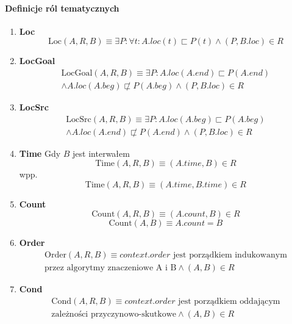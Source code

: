\documentclass[a4paper, 12pt]{article}
\theoremstyle{remark}
\begin{document}
\paragraph{Definicje ról tematycznych} %
\label{par:role_tematyczne}
\begin{enumerate}
\item \textbf{Loc}
\begin{equation}
\text{Loc}(A,R,B) \equiv \exists P: \forall t: A.loc(t) \sqsubset P(t) \wedge (P,B.loc) \in R
\end{equation}
\item \textbf{LocGoal}
\begin{align}
\nonumber\text{LocGoal}(A,R,B) \equiv \exists P: A.loc(A.end) \sqsubset P(A.end) \\ \wedge A.loc(A.beg) \not\sqsubset P(A.beg) \wedge (P,B.loc) \in R
\end{align}
\item \textbf{LocSrc}
\begin{align}
\nonumber\text{LocSrc}(A,R,B) \equiv \exists P: A.loc(A.beg) \sqsubset P(A.beg) \\ \wedge A.loc(A.end) \not\sqsubset P(A.end) \wedge (P,B.loc) \in R
\end{align}
\item \textbf{Time}
Gdy $B$ jest interwałem
\begin{equation}
\text{Time}(A,R,B) \equiv (A.time,B) \in R
\end{equation}
wpp.
\begin{equation}
\text{Time}(A,R,B) \equiv (A.time,B.time) \in R
\end{equation}
\item \textbf{Count}
\begin{equation}
\text{Count}(A,R,B) \equiv (A.count,B) \in R
\end{equation}
\begin{equation}
\text{Count}(A,B) \equiv A.count = B
\end{equation}
\item \textbf{Order}
\begin{align}
\nonumber\text{Order}(A,R,B) \equiv
context.order \text{ jest porządkiem indukowanym} \\ \text{przez algorytmy znaczeniowe A i B} \wedge (A,B) \in R
\end{align}
\item \textbf{Cond}
\begin{align}
\nonumber\text{Cond}(A,R,B) \equiv context.order \text{ jest porządkiem oddającym} \\ \text{zależności przyczynowo-skutkowe} \wedge (A,B) \in R
\end{align}
\end{enumerate}
\end{document}
